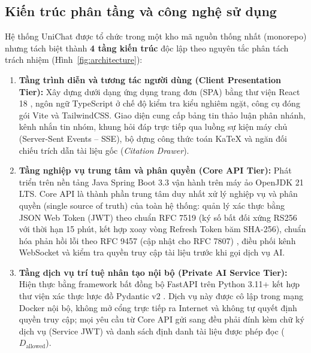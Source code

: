 \documentclass{IEEEtran}
\begin{document}
\subsection{Kiến trúc phân tầng và công nghệ sử dụng}
Hệ thống UniChat được tổ chức trong một kho mã nguồn thống nhất (monorepo) nhưng tách biệt thành \textbf{4 tầng kiến trúc} độc lập theo nguyên tắc phân tách trách nhiệm (Hình~\ref{fig:architecture}):
\begin{enumerate}
    \item \textbf{Tầng trình diễn và tương tác người dùng (Client Presentation Tier):} Xây dựng dưới dạng ứng dụng trang đơn (SPA) bằng thư viện React 18 \cite{react_docs}, ngôn ngữ TypeScript ở chế độ kiểm tra kiểu nghiêm ngặt, công cụ đóng gói Vite và TailwindCSS. Giao diện cung cấp bảng tin thảo luận phân nhánh, kênh nhắn tin nhóm, khung hỏi đáp trực tiếp qua luồng sự kiện máy chủ (Server-Sent Events -- SSE), bộ dựng công thức toán KaTeX và ngăn đối chiếu trích dẫn tài liệu gốc (\textit{Citation Drawer}).
    \item \textbf{Tầng nghiệp vụ trung tâm và phân quyền (Core API Tier):} Phát triển trên nền tảng Java Spring Boot 3.3 \cite{spring_boot_docs} vận hành trên máy ảo OpenJDK 21 LTS. Core API là thành phần trung tâm duy nhất xử lý nghiệp vụ và phân quyền (single source of truth) của toàn hệ thống: quản lý xác thực bằng JSON Web Token (JWT) theo chuẩn RFC 7519 \cite{jwt2015rfc} (ký số bất đối xứng RS256 với thời hạn 15 phút, kết hợp xoay vòng Refresh Token băm SHA-256), chuẩn hóa phản hồi lỗi theo RFC 9457 (cập nhật cho RFC 7807) \cite{rfc9457}, điều phối kênh WebSocket và kiểm tra quyền truy cập tài liệu trước khi gọi dịch vụ AI.
    \item \textbf{Tầng dịch vụ trí tuệ nhân tạo nội bộ (Private AI Service Tier):} Hiện thực bằng framework bất đồng bộ FastAPI trên Python 3.11+ kết hợp thư viện xác thực lược đồ Pydantic v2 \cite{fastapi_docs}. Dịch vụ này được cô lập trong mạng Docker nội bộ, không mở cổng trực tiếp ra Internet và không tự quyết định quyền truy cập; mọi yêu cầu từ Core API gửi sang đều phải đính kèm chữ ký dịch vụ (Service JWT) và danh sách định danh tài liệu được phép đọc ($D_{\text{allowed}}$).

\end{enumerate}
\end{document}

